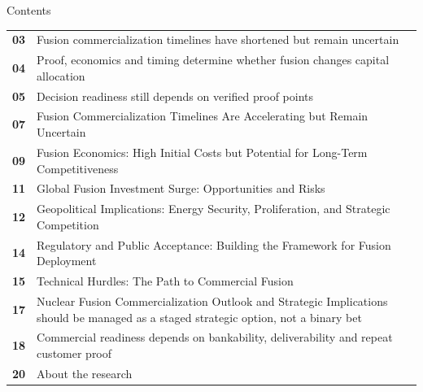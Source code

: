 \documentclass[10pt,a4paper]{article}
\begin{document}
\clearpage
\noindent{}\par\vspace{8pt}
{\sffamily\fontsize{26}{31}\selectfont\color{BONavy} Contents}\par\vspace{10pt}
\begin{minipage}[t]{0.57\linewidth}
\begin{tabularx}{\linewidth}{p{12mm}Y}
\textcolor{BOGreen}{\bfseries 03} & {\footnotesize Fusion commercialization timelines have shortened but remain uncertain} \\[4pt]
\textcolor{BOGreen}{\bfseries 04} & {\footnotesize Proof, economics and timing determine whether fusion changes capital allocation} \\[4pt]
\textcolor{BOGreen}{\bfseries 05} & {\footnotesize Decision readiness still depends on verified proof points} \\[4pt]
\textcolor{BOGreen}{\bfseries 07} & {\footnotesize Fusion Commercialization Timelines Are Accelerating but Remain Uncertain} \\[4pt]
\textcolor{BOGreen}{\bfseries 09} & {\footnotesize Fusion Economics: High Initial Costs but Potential for Long-Term Competitiveness} \\[4pt]
\textcolor{BOGreen}{\bfseries 11} & {\footnotesize Global Fusion Investment Surge: Opportunities and Risks} \\[4pt]
\textcolor{BOGreen}{\bfseries 12} & {\footnotesize Geopolitical Implications: Energy Security, Proliferation, and Strategic Competition} \\[4pt]
\textcolor{BOGreen}{\bfseries 14} & {\footnotesize Regulatory and Public Acceptance: Building the Framework for Fusion Deployment} \\[4pt]
\textcolor{BOGreen}{\bfseries 15} & {\footnotesize Technical Hurdles: The Path to Commercial Fusion} \\[4pt]
\textcolor{BOGreen}{\bfseries 17} & {\footnotesize Nuclear Fusion Commercialization Outlook and Strategic Implications should be managed as a staged strategic option, not a binary bet} \\[4pt]
\textcolor{BOGreen}{\bfseries 18} & {\footnotesize Commercial readiness depends on bankability, deliverability and repeat customer proof} \\[4pt]
\textcolor{BOGreen}{\bfseries 20} & {\footnotesize About the research} \\[4pt]

\end{tabularx}
\end{minipage}
\end{document}

